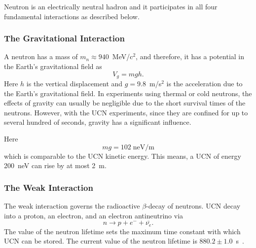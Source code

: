 
Neutron is an electrically neutral hadron and it participates in all
four fundamental interactions as described below.


\subsubsection{The Gravitational Interaction}
A neutron has a mass of $m_n\approx 940$~MeV/c$^2$, and therefore, it has a
potential in the Earth's gravitational field as
\begin{equation}
V_g=mgh.
\end{equation}
Here $h$ is the vertical displacement and $g=9.8$~m/s$^2$ is the
acceleration due to the Earth's gravitational field.  In experiments
using thermal or cold neutrons, the effects of gravity can usually be
negligible due to the short survival times of the neutrons. However,
with the UCN experiments, since they are confined for up to several
hundred of seconds, gravity has a significant influence.

Here
\begin{equation}
mg=102\; \text{neV/m}
\end{equation}
which is comparable to the UCN kinetic energy. This means, a UCN of
energy 200~neV can rise by at most 2~m.
\subsubsection{The Weak Interaction}
The weak interaction governs the radioactive $\beta$-decay of
neutrons. UCN decay into a proton, an electron, and an electron
antineutrino via
\label{neutrondecay}
\begin{equation}
n\longrightarrow p+e^{-}+\bar{\nu_{e}}.
\end{equation}
The value of the neutron lifetime sets the maximum time constant with
which UCN can be stored. The current value of the neutron lifetime is
$880.2 \pm 1.0$~s~\cite{PDG2018}.

